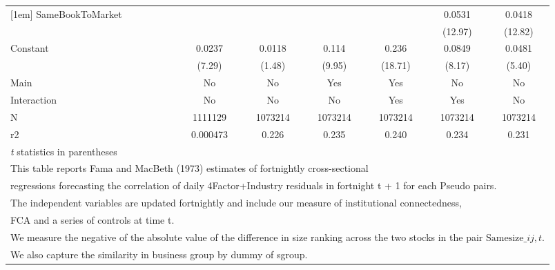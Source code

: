 {\begin{tabular}{l*{6}{c}}
[1em]
SameBookToMarket    &                     &                     &                     &                     &      0.0531\sym{***}&      0.0418\sym{***}\\
                    &                     &                     &                     &                     &     (12.97)         &     (12.82)         \\
[1em]
Constant            &      0.0237\sym{***}&      0.0118         &       0.114\sym{***}&       0.236\sym{***}&      0.0849\sym{***}&      0.0481\sym{***}\\
                    &      (7.29)         &      (1.48)         &      (9.95)         &     (18.71)         &      (8.17)         &      (5.40)         \\
\hline
Main                &          No         &          No         &         Yes         &         Yes         &          No         &          No         \\
Interaction         &          No         &          No         &          No         &         Yes         &         Yes         &          No         \\
N                   &     1111129         &     1073214         &     1073214         &     1073214         &     1073214         &     1073214         \\
r2                  &    0.000473         &       0.226         &       0.235         &       0.240         &       0.234         &       0.231         \\
\hline\hline
\multicolumn{7}{l}{\footnotesize \textit{t} statistics in parentheses}\\
\multicolumn{7}{l}{\footnotesize This table reports Fama and MacBeth (1973) estimates of fortnightly cross-sectional}\\
\multicolumn{7}{l}{\footnotesize  regressions forecasting the correlation of daily 4Factor+Industry residuals in fortnight t + 1 for each Pseudo pairs.}\\
\multicolumn{7}{l}{\footnotesize The independent variables are updated fortnightly and include our measure of institutional connectedness,}\\
\multicolumn{7}{l}{\footnotesize  FCA and a series of controls at time t.}\\
\multicolumn{7}{l}{\footnotesize We measure the negative of the absolute value of the difference in size ranking across the two stocks in the pair $ \text{Samesize}\_{ij,t} $.}\\
\multicolumn{7}{l}{\footnotesize We also capture the similarity in business group by dummy of sgroup.}\\

\end{tabular}}

